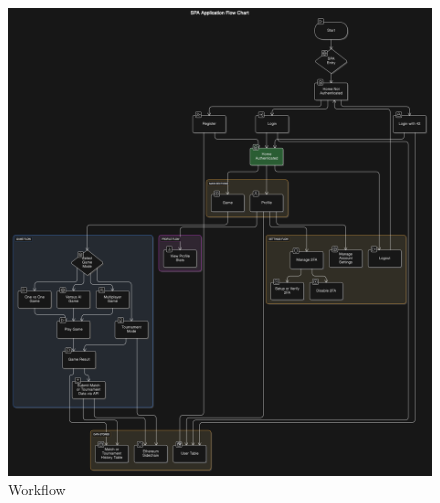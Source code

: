 \begin{figure}[H]
    \includegraphics[width=1\linewidth]{Figures/images/workflow.png}
    \caption{Workflow}
    \label{fig:workflow}
\end{figure}


